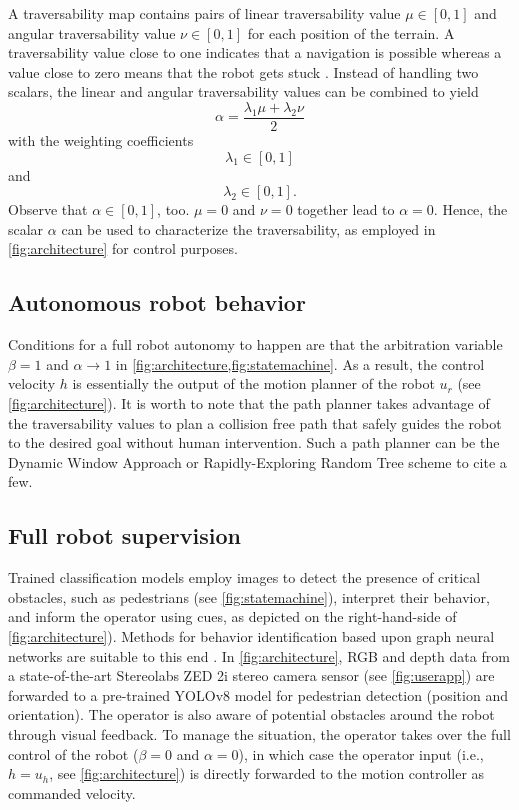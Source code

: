 \documentclass[letterpaper, 10 pt, conference]{ieeeconf}  %
\begin{document}
A traversability map  contains pairs of linear traversability value $\mu \in [0,1]$  and angular traversability value $\nu\in [0,1]$ for each position of the terrain. A traversability value close to one indicates that a navigation is possible whereas a value close to zero means that the robot  gets stuck \cite{wayfast}. Instead of handling two scalars, the linear and angular traversability values can be combined to yield 
\begin{equation}
	\alpha = \frac{\lambda_1 \mu + \lambda_2 \nu}{2}
\end{equation}
with the weighting coefficients
\begin{equation}
	\lambda_1 \in [0,1]
\end{equation}
and 
\begin{equation}
	\lambda_2 \in [0,1].
\end{equation}
Observe that $\alpha \in [0,1]$, too. $\mu = 0$ and $\nu = 0$ together lead  to $\alpha = 0$. Hence, the scalar $\alpha$ can be used to characterize the traversability, as employed in \cref{fig:architecture} for control purposes.

\subsection{Autonomous robot behavior}
Conditions for a full robot autonomy to happen are that the arbitration variable $\beta=1$ and $\alpha\rightarrow 1$ in 	\cref{fig:architecture,fig:statemachine}. As a result, the control velocity $h$ is essentially the output of the motion planner of the  robot $u_r$ (see \cref{fig:architecture}). It is worth to note that the path planner takes advantage of the traversability values to plan a collision free path that safely guides  the robot to the desired goal without human intervention.  Such a path planner can be the Dynamic Window Approach or  Rapidly-Exploring Random Tree scheme  \cite{leung2022hybrid} to cite a few.

\subsection{Full robot supervision}
Trained classification models employ images to detect the presence of critical obstacles, such as pedestrians (see \cref{fig:statemachine}), interpret their behavior, and inform the operator using cues, as depicted on the right-hand-side of \cref{fig:architecture}). Methods for behavior identification based upon graph neural networks are suitable to this end \cite{jang2024multi}. In \cref{fig:architecture}, RGB and depth data from a state-of-the-art Stereolabs ZED 2i stereo camera sensor (see 	\cref{fig:userapp}) are forwarded to a pre-trained YOLOv8 model for pedestrian detection (position and orientation). The operator is also aware of potential obstacles around the robot  through visual feedback. To manage the situation, the operator takes over the full control of the robot ($\beta = 0$ and $\alpha = 0$), in which case the operator input (i.e., $h=u_h$, see \cref{fig:architecture}) is directly forwarded to the motion controller as commanded velocity.
\end{document}
